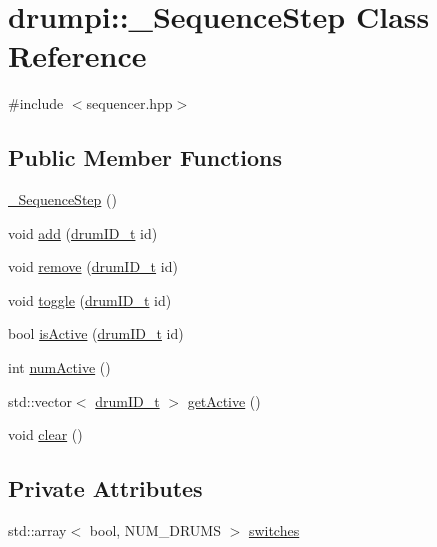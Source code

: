 \hypertarget{classdrumpi_1_1__SequenceStep}{}\section{drumpi\+:\+:\+\_\+\+Sequence\+Step Class Reference}
\label{classdrumpi_1_1__SequenceStep}


{\ttfamily \#include $<$sequencer.\+hpp$>$}

\subsection*{Public Member Functions}
\begin{DoxyCompactItemize}
\item 
\hyperlink{classdrumpi_1_1__SequenceStep_a6c8599793a94b7b0cff5c149642084a4}{\+\_\+\+Sequence\+Step} ()
\item 
void \hyperlink{classdrumpi_1_1__SequenceStep_a3a1aedae1dd5ec32012078ed31994b71}{add} (\hyperlink{namespacedrumpi_a3897274035c1b939a604438abe648b1b}{drum\+I\+D\+\_\+t} id)
\item 
void \hyperlink{classdrumpi_1_1__SequenceStep_aac9f1fb395bcdf5e113858f320aae53c}{remove} (\hyperlink{namespacedrumpi_a3897274035c1b939a604438abe648b1b}{drum\+I\+D\+\_\+t} id)
\item 
void \hyperlink{classdrumpi_1_1__SequenceStep_ae0f883e4fdb3168b3f62392a8d6fa629}{toggle} (\hyperlink{namespacedrumpi_a3897274035c1b939a604438abe648b1b}{drum\+I\+D\+\_\+t} id)
\item 
bool \hyperlink{classdrumpi_1_1__SequenceStep_aea69e82bebcb219d2b85421e00841d95}{is\+Active} (\hyperlink{namespacedrumpi_a3897274035c1b939a604438abe648b1b}{drum\+I\+D\+\_\+t} id)
\item 
int \hyperlink{classdrumpi_1_1__SequenceStep_a1840f94bc8c1fc25c101bfbc0b9d1f9b}{num\+Active} ()
\item 
std\+::vector$<$ \hyperlink{namespacedrumpi_a3897274035c1b939a604438abe648b1b}{drum\+I\+D\+\_\+t} $>$ \hyperlink{classdrumpi_1_1__SequenceStep_add716bdfeac7423ed9b737cade2751ff}{get\+Active} ()
\item 
void \hyperlink{classdrumpi_1_1__SequenceStep_a19b7857452401f3f4522e9c0cecfdbf5}{clear} ()
\end{DoxyCompactItemize}
\subsection*{Private Attributes}
\begin{DoxyCompactItemize}
\item 
std\+::array$<$ bool, N\+U\+M\+\_\+\+D\+R\+U\+MS $>$ \hyperlink{classdrumpi_1_1__SequenceStep_afa0595e58606f38c3153e748ac1df551}{switches}
\end{DoxyCompactItemize}


